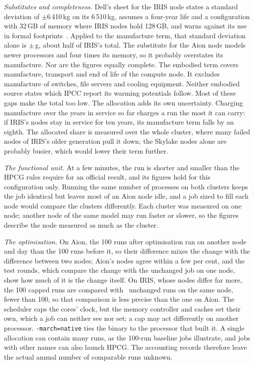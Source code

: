 \documentclass[conference,a4paper]{IEEEtran}
\begin{document}
\emph{Substitutes and completeness.} Dell's sheet for the IRIS node states a
standard deviation of $\pm$6\,410\,kg on its 6\,510\,kg, assumes a four-year
life and a configuration with 32\,GB of memory where IRIS nodes hold 128\,GB, and
warns against its use in formal footprints~\cite{dell-c6420-pcf}. Applied to
the manufacture term, that standard deviation alone is $\pm$\IrisEmbSdGrams\,g,
about half of IRIS's total. The substitute
for the Aion node models newer processors and four times its memory, so it
probably overstates its manufacture. Nor are the figures equally complete. The
embodied term covers manufacture, transport and end of life of the compute node.
It excludes manufacture of switches, file servers and cooling equipment. Neither embodied
source states which IPCC report its warming potentials follow. Most of these
gaps make the total too low. The allocation adds its own uncertainty. Charging
manufacture over the years in service so far charges a run the most it can
carry: if IRIS's nodes stay in service for ten years, its manufacture term falls
by an eighth. The allocated share is measured over the whole cluster, where many
failed nodes of IRIS's older generation pull it down; the Skylake nodes alone
are probably busier, which would lower their term further.

\emph{The functional unit.} At a few minutes, the run is shorter and smaller
than the HPCG rules require for an official result, and its figures hold for
this configuration only. Running the same number of processes on both clusters
keeps the job identical but leaves most of an Aion node idle, and a job sized to
fill each node would compare the clusters differently. Each cluster was measured
on one node; another node of the same model may run faster or slower, so the
figures describe the node measured as much as the cluster.

\emph{The optimisation.} On Aion, the 100 runs after optimisation ran on another
node and day than the 100 runs before it, so their difference mixes the change
with the difference between two nodes; Aion's nodes agree within a few per cent,
and the test rounds, which compare the change with the unchanged job on one node,
show how much of it is the change itself. On IRIS, whose nodes differ far more,
the 100 capped runs are compared with \IrisCmpN\ unchanged runs on the same node,
fewer than 100, so that comparison is less precise than the one on Aion. The scheduler caps the
cores' clock, but the memory controller and caches set their own, which a job
can neither see nor set; a cap may act differently on another processor.
\texttt{-march=native} ties the binary to the processor that built it. A single
allocation can contain many runs, as the 100-run baseline jobs illustrate, and
jobs with other names can also launch HPCG. The accounting records therefore
leave the actual annual number of comparable runs unknown.
\end{document}
